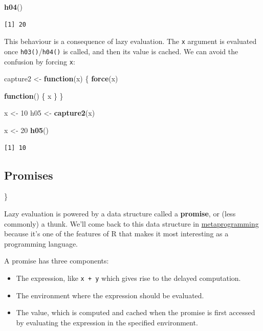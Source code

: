 \documentclass[]{book}
\newenvironment{Shaded}{\begin{snugshade}}{\end{snugshade}}
\newcommand{\ControlFlowTok}[1]{\textcolor[rgb]{0.13,0.29,0.53}{\textbf{#1}}}
\newcommand{\DecValTok}[1]{\textcolor[rgb]{0.00,0.00,0.81}{#1}}
\newcommand{\KeywordTok}[1]{\textcolor[rgb]{0.13,0.29,0.53}{\textbf{#1}}}
\newcommand{\NormalTok}[1]{#1}
\newcommand{\StringTok}[1]{\textcolor[rgb]{0.31,0.60,0.02}{#1}}
\theoremstyle{definition}
\theoremstyle{definition}
\theoremstyle{definition}
\theoremstyle{remark}
\begin{document}
\begin{Shaded}
\begin{Highlighting}[]
\KeywordTok{h04}\NormalTok{()}
\end{Highlighting}
\end{Shaded}

\begin{verbatim}
[1] 20
\end{verbatim}

This behaviour is a consequence of lazy evaluation. The \texttt{x}
argument is evaluated once \texttt{h03()}/\texttt{h04()} is called, and
then its value is cached. We can avoid the confusion by forcing
\texttt{x}:

\begin{Shaded}
\begin{Highlighting}[]
\NormalTok{capture2 <-}\StringTok{ }\ControlFlowTok{function}\NormalTok{(x) \{}
  \KeywordTok{force}\NormalTok{(x)}
  
  \ControlFlowTok{function}\NormalTok{() \{}
\NormalTok{    x}
\NormalTok{  \}}
\NormalTok{\}}

\NormalTok{x <-}\StringTok{ }\DecValTok{10}
\NormalTok{h05 <-}\StringTok{ }\KeywordTok{capture2}\NormalTok{(x)}

\NormalTok{x <-}\StringTok{ }\DecValTok{20}
\KeywordTok{h05}\NormalTok{()}
\end{Highlighting}
\end{Shaded}

\begin{verbatim}
[1] 10
\end{verbatim}

\hypertarget{promises}{%
\subsection{Promises}\label{promises}}

\}

Lazy evaluation is powered by a data structure called a
\textbf{promise}, or (less commonly) a thunk. We'll come back to this
data structure in \protect\hyperlink{meta}{metaprogramming} because it's
one of the features of R that makes it most interesting as a programming
language.

A promise has three components:

\begin{itemize}
\item
  The expression, like \texttt{x\ +\ y} which gives rise to the delayed
  computation.
\item
  The environment where the expression should be evaluated.
\item
  The value, which is computed and cached when the promise is first
  accessed by evaluating the expression in the specified environment.
\end{itemize}
\end{document}
